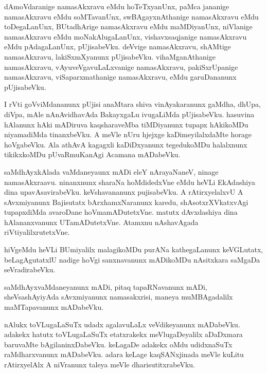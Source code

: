 \documentclass{article}
\begin{document}
\begin{mn}
dAmoVdaranige  namasAkxravu  eMdu  hoTeTxyanUnx,  paMca  jananige  namasAkxravu   eMdu  
soMTavanUnx,  swBAgayxnAthanige  namasAkxravu  eMdu  toDegaLanUnx,  BUtadhArige  namasAkxravu  
eMdu  maMDiyanUnx,  niVlanige  namasAkxravu  eMdu  moNakAlugaLanUnx,  vishavxsaqjanige  
namasAkxravu  eMdu  pAdagaLanUnx,  pUjisabeVku.  deVvige  namasAkxravu,  shAMtige  namasAkxravu,  
lakiSxmXyanunx  pUjisabeVku.  vihaMganAthanige  namasAkxravu,  vAyuveVgavuLaLxvanige  namasAkxravu,  
pakiSxrUpanige  namasAkxravu,  viSaparxmathanige  namasAkxravu,  eMdu  garuDananunx  pUjisabeVku.
\end{mn}

\begin{mn}
I rVti  goVviMdananunx  pUjisi  anaMtara  shiva  vinAyakaranunx  gaMdha, dhUpa,  diVpa,  
mAle  nAnAvidhavAda  BakayxgaLu  ivugaLiMda  pUjisabeVku.  hasuvina  hAlanunx  hAki  
mADiruva  kaqsharaveMba  tiMDiyanunx  tupapx hAkikoMDu  niyamadiMda  tinanxbeVku.  
A meVle  nUru  hjejxge  kaDimeyilalxdaMte  horage  hoVgabeVku.  Ala  athAvA  kagagxli  
kaDiDxyanunx  tegedukoMDu  halalxnunx  tikikxkoMDu  pUvaRmuKanAgi  Acamana  mADabeVku.
\end{mn}

\begin{mn}
 saMdhAyxkAlada  vaMdaneyaunx  mADi  eleY  nArayaNaneV,  ninage  namasAkxraavu.  ninanxnunx  
 sharaNa  hoMdidedxVne  eMdu  heVLi  EkAdashiya  dina  upavAsavirabeVku.  keVshavananunx  
 pujisabeVku.  A  rAtirxyelalxvU  A  sAvxmiyanunx  Bajisutatx  bArxhamxNaranunx  karedu,  
 shAsotxrXVkatxvAgi  tupapxdiMda  avaroDane  hoVmamADutetxVne.  matutx  dAvxdashiya  dina  
 hAlananxvanunx  UTamADutetxVne.  Atamxnu  nAshavAgada  riVtiyalilxrutetxVne.
\end{mn}

\begin{mn}
hiVgeMdu  heVLi  BUmiyalilx  malagikoMDu  purANa  kathegaLanunx  keVGLutatx,  beLagAgutatxlU  
nadige  hoVgi sanxnavanunx  mADikoMDu  nAsitxkara  saMgaDa  seVradirabeVku.
\end{mn}

\begin{mn}
saMdhAyxvaMdaneyanunx  mADi,  pitaq  tapaRNavanunx  mADi,  sheVsashAyiyAda  sAvxmiyanunx  
namasakxrisi,  maneya  muMBAgadalilx  maMTapavanunx  mADabeVku.  
\end{mn}

\begin{mn}
nAlukx  toVLugaLaSuTx  udadx  agalavuLaLx  veVdikeyanunx  mADabeVku.  adakekx  hatutx  
toVLugaLaSuTx  etatxrakekx  meVlugaDeyalilx  aDaDxmara  baruvaMte  bAgilaninxDabeVku.  
keLagaDe  adakekx  oMdu  udidxnaSuTx  raMdharxvanunx  mADabeVku.  adara  keLage  
kaqSANxjinada  meVle  kuLitu  rAtirxyelAlx  A  niVranunx  taleya  meVle  dharisutitxrabeVku.
\end{mn}
\end{document}
